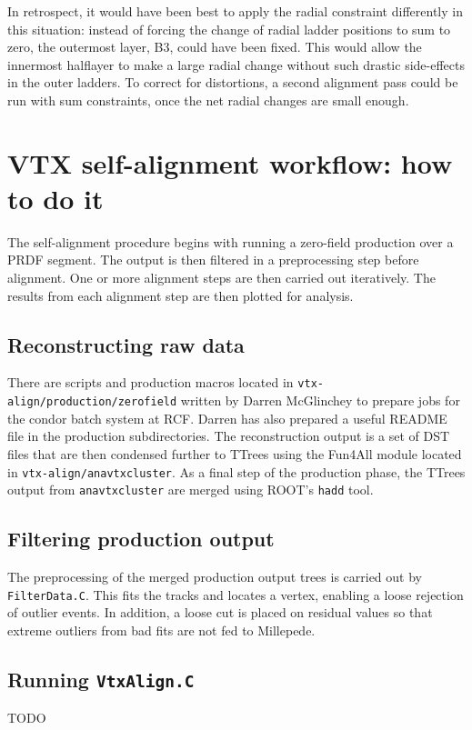 \documentclass[12pt]{article}
\begin{document}
In retrospect, it would have been best to apply the radial constraint differently in this situation: instead of forcing the change of radial ladder positions to sum to zero, the outermost layer, B3, could have been fixed. This would allow the innermost halflayer to make a large radial change without such drastic side-effects in the outer ladders. To correct for distortions, a second alignment pass could be run with sum constraints, once the net radial changes are small enough.



\section{VTX self-alignment workflow: how to do it}
The self-alignment procedure begins with running a zero-field production over a PRDF segment. The output is then filtered in a preprocessing step before alignment. One or more alignment steps are then carried out iteratively. The results from each alignment step are then plotted for analysis.

\subsection{Reconstructing raw data}
There are scripts and production macros located in \texttt{vtx-align/production/\-zerofield} written by Darren McGlinchey to prepare jobs for the condor batch system at RCF. Darren has also prepared a useful README file in the production subdirectories. The reconstruction output is a set of DST files that are then condensed further to TTrees using the Fun4All module located in \texttt{vtx-align/anavtxcluster}. As a final step of the production phase, the TTrees output from \texttt{anavtxcluster} are merged using ROOT's \texttt{hadd} tool.

\subsection{Filtering production output}
The preprocessing of the merged production output trees is carried out by \texttt{FilterData.C}. This fits the tracks and locates a vertex, enabling a loose rejection of outlier events. In addition, a loose cut is placed on residual values so that extreme outliers from bad fits are not fed to Millepede.

\subsection{Running \texttt{VtxAlign.C}}
TODO
\end{document}
